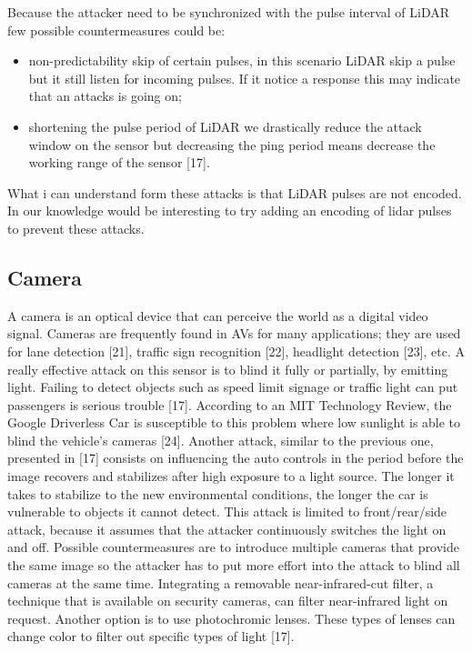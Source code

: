     Because the attacker need to be synchronized with the pulse interval of LiDAR few possible countermeasures could be:
    \begin{itemize}
        \item non-predictability skip of certain pulses, in this scenario LiDAR skip a pulse but it still listen for incoming pulses. If it notice a response this may indicate that an attacks is going on;
        \item shortening the pulse period of LiDAR we drastically reduce the attack window on the sensor but decreasing the ping period means decrease the working range of the sensor [17].
    \end{itemize}
    What i can understand form these attacks is that LiDAR pulses are not encoded. In our knowledge would be interesting to try adding an encoding of lidar pulses to prevent these attacks.
    
\subsection{Camera}
    A camera is an optical device that can perceive the world as a digital video signal. Cameras are frequently found in AVs for many applications; they are used for lane detection [21], traffic sign recognition [22], headlight detection [23], etc. 
    \newline
    A really effective attack on this sensor is to blind it fully or partially, by emitting light. Failing to detect objects such as speed limit signage or traffic light can put passengers is serious trouble [17]. According to an MIT Technology Review, the Google Driverless Car is susceptible to this problem where low sunlight is able to blind the vehicle’s cameras [24].
    \newline
    Another attack, similar to the previous one, presented in [17] consists on influencing the auto controls in the period before the image recovers and stabilizes after high exposure to a light source. The longer it takes to stabilize to the new environmental conditions, the longer the car is vulnerable to objects it cannot detect. This attack is limited to front/rear/side attack, because it assumes that the attacker continuously switches the light on and off. 
    \newline
    Possible countermeasures are to introduce multiple cameras that provide the same image so the attacker has to put more effort into the attack to blind all cameras at the same time. Integrating a removable near-infrared-cut filter, a technique that is available on security cameras, can filter near-infrared light on request. Another option is to use photochromic lenses. These types of lenses can change color to filter out specific types of light [17]. 

